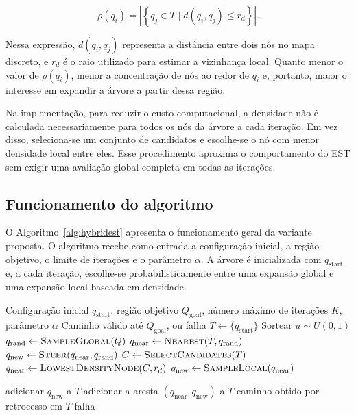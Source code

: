 \begin{equation}
    \rho(q_i) =
    \left|
    \left\{
        q_j \in T \mid d(q_i,q_j) \leq r_d
    \right\}
    \right|.
    \label{eq:densidade_hybridest}
\end{equation}

Nessa expressão, $d(q_i,q_j)$ representa a distância entre dois nós no mapa discreto, e $r_d$ é o raio utilizado para estimar a vizinhança local. Quanto menor o valor de $\rho(q_i)$, menor a concentração de nós ao redor de $q_i$ e, portanto, maior o interesse em expandir a árvore a partir dessa região.

Na implementação, para reduzir o custo computacional, a densidade não é calculada necessariamente para todos os nós da árvore a cada iteração. Em vez disso, seleciona-se um conjunto de candidatos e escolhe-se o nó com menor densidade local entre eles. Esse procedimento aproxima o comportamento do EST sem exigir uma avaliação global completa em todas as iterações.

\subsection{Funcionamento do algoritmo}
\label{subsec:funcionamento_hybridest}

O Algoritmo~\ref{alg:hybridest} apresenta o funcionamento geral da variante proposta. O algoritmo recebe como entrada a configuração inicial, a região objetivo, o limite de iterações e o parâmetro $\alpha$. A árvore é inicializada com $q_{\mathrm{start}}$ e, a cada iteração, escolhe-se probabilisticamente entre uma expansão global e uma expansão local baseada em densidade.

\begin{algorithm}[H]
\caption{HybridEST}
\label{alg:hybridest}
\begin{algorithmic}[1]
\Require Configuração inicial $q_{\mathrm{start}}$, região objetivo $Q_{\mathrm{goal}}$, número máximo de iterações $K$, parâmetro $\alpha$
\Ensure Caminho válido até $Q_{\mathrm{goal}}$, ou falha
\State $T \gets \{q_{\mathrm{start}}\}$
    \State Sortear $u \sim U(0,1)$
        \State $q_{\mathrm{rand}} \gets \textsc{SampleGlobal}(Q)$
        \State $q_{\mathrm{near}} \gets \textsc{Nearest}(T, q_{\mathrm{rand}})$
        \State $q_{\mathrm{new}} \gets \textsc{Steer}(q_{\mathrm{near}}, q_{\mathrm{rand}})$
    \Else
        \State $C \gets \textsc{SelectCandidates}(T)$
        \State $q_{\mathrm{near}} \gets \textsc{LowestDensityNode}(C, r_d)$
        \State $q_{\mathrm{new}} \gets \textsc{SampleLocal}(q_{\mathrm{near}})$
    \EndIf

        \State adicionar $q_{\mathrm{new}}$ a $T$
        \State adicionar a aresta $(q_{\mathrm{near}}, q_{\mathrm{new}})$ a $T$
            \State \Return caminho obtido por retrocesso em $T$
        \EndIf
    \EndIf
\EndFor
\State \Return falha
\end{algorithmic}
\end{algorithm}

